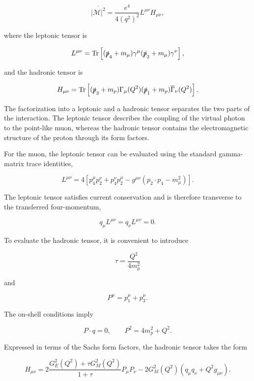 \begin{equation}
\overline{|\mathcal{M}|^2}
=
\frac{e^4}{4(q^2)^2}
L^{\mu\nu}H_{\mu\nu},
\label{eq:tensor_factorization}
\end{equation}

where the leptonic tensor is

\[
L^{\mu\nu}
=
\operatorname{Tr}
\left[
(\slashed{p}_4+m_\mu)
\gamma^\mu
(\slashed{p}_2+m_\mu)
\gamma^\nu
\right],
\]

and the hadronic tensor is

\[
H_{\mu\nu}
=
\operatorname{Tr}
\left[
(\slashed{p}_3+m_p)
\Gamma_\mu(Q^2)
(\slashed{p}_1+m_p)
\overline{\Gamma}_\nu(Q^2)
\right].
\]

The factorization into a leptonic and a hadronic tensor separates the two parts of the interaction. The leptonic tensor describes the coupling of the virtual photon to the point-like muon, whereas the hadronic tensor contains the electromagnetic structure of the proton through its form factors.

For the muon, the leptonic tensor can be evaluated using the standard gamma-matrix trace identities,

\begin{equation}
L^{\mu\nu}
=
4\left[
p_4^\mu p_2^\nu
+p_4^\nu p_2^\mu
-g^{\mu\nu}
\left(
p_2\cdot p_4-m_\mu^2
\right)
\right].
\label{eq:massive_leptonic_tensor}
\end{equation}

The leptonic tensor satisfies current conservation and is therefore transverse to the transferred four-momentum,

\[
q_\mu L^{\mu\nu}
=
q_\nu L^{\mu\nu}
=
0.
\]

To evaluate the hadronic tensor, it is convenient to introduce

\begin{equation}
\tau
=
\frac{Q^2}{4m_p^2}
\label{eq:tau}
\end{equation}

and

\[
P^\mu
=
p_1^\mu+p_3^\mu.
\]

The on-shell conditions imply

\[
P\cdot q=0,
\qquad
P^2=4m_p^2+Q^2.
\]

Expressed in terms of the Sachs form factors, the hadronic tensor takes the form

\begin{equation}
H_{\mu\nu}
=
2\frac{G_E^2(Q^2)+\tau G_M^2(Q^2)}
{1+\tau}
P_\mu P_\nu
-
2G_M^2(Q^2)
\left(
q_\mu q_\nu
+
Q^2g_{\mu\nu}
\right).
\label{eq:hadronic_tensor_sachs}
\end{equation}

